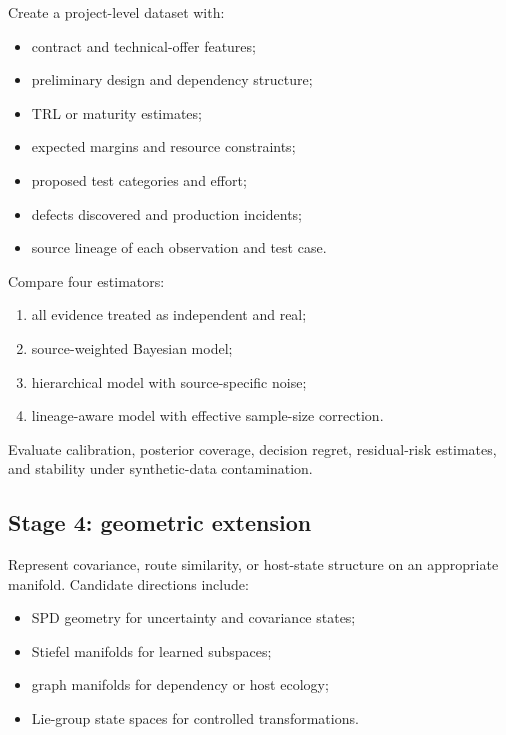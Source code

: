 Create a project-level dataset with:

\begin{itemize}[leftmargin=*]
  \item contract and technical-offer features;
  \item preliminary design and dependency structure;
  \item TRL or maturity estimates;
  \item expected margins and resource constraints;
  \item proposed test categories and effort;
  \item defects discovered and production incidents;
  \item source lineage of each observation and test case.
\end{itemize}

Compare four estimators:

\begin{enumerate}[leftmargin=*]
  \item all evidence treated as independent and real;
  \item source-weighted Bayesian model;
  \item hierarchical model with source-specific noise;
  \item lineage-aware model with effective sample-size correction.
\end{enumerate}

Evaluate calibration, posterior coverage, decision regret, residual-risk estimates, and stability under synthetic-data contamination.

\subsection{Stage 4: geometric extension}

Represent covariance, route similarity, or host-state structure on an appropriate manifold. Candidate directions include:

\begin{itemize}[leftmargin=*]
  \item SPD geometry for uncertainty and covariance states;
  \item Stiefel manifolds for learned subspaces;
  \item graph manifolds for dependency or host ecology;
  \item Lie-group state spaces for controlled transformations.
\end{itemize}

